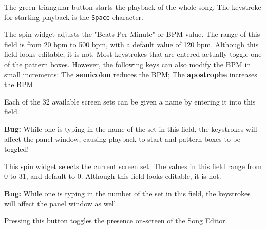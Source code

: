    The green triangular button starts the playback of the whole song.
   The keystroke for starting playback is the \texttt{Space} character.

   The spin widget adjusts the "Beats Per Minute" or BPM value.  The
   range of this field is from 20 bpm to 500 bpm, with a default value of
   120 bpm.
   Although this field looks editable, it is not.  Most keystrokes
   that are entered actually toggle one of the pattern boxes.
   However, the following keys can also modify the BPM in small increments:
    The \textbf{semicolon} reduces the BPM;
    The \textbf{apostrophe} increases the BPM.

   Each of the 32 available screen sets can be given a name by entering it
   into this field.

   \textbf{Bug:}
   While one is typing in the name of the set in this field, the keystrokes
   will affect the panel window, causing playback to start and pattern
   boxes to be toggled!

   This spin widget selects the current screen set.  The values in this
   field range from 0 to 31, and default to 0.
   Although this field looks editable, it is not.

   \textbf{Bug:}
   While one is typing in the number of the set in this field, the keystrokes
   will affect the panel window as well.

   Pressing this button toggles the presence on-screen of the Song
   Editor.

